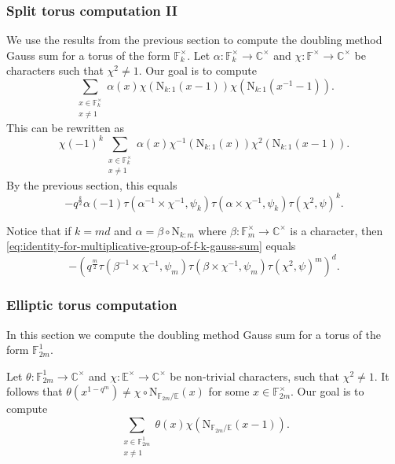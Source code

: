 \documentclass[12pt, reqno]{amsart}
\theoremstyle{definition}
\theoremstyle{definition}
\theoremstyle{definition}
\newcommand{\cComplex}{\mathbb{C}}
\newcommand{\multiplicativegroup}[1]{#1^{\times}}
\newcommand{\fieldCharacter}{\psi}
\newcommand{\FieldNorm}[2]{\mathrm{N}_{#1:#2}}
\newcommand{\aFieldNorm}{\mathrm{N}}
\newcommand{\finiteField}{\mathbb{F}}
\newcommand{\quadraticExtension}{\mathbb{E}}
\newcommand{\finiteFieldExtension}[1]{\finiteField_{#1}}
\newcommand{\GaussSumCharacter}[3]{\tau\left(#1 \times #2, #3\right)}
\begin{document}
\subsubsection{Split torus computation II}
We use the results from the previous section to compute the doubling method Gauss sum for a torus of the form $\multiplicativegroup{\finiteFieldExtension{k}}$. Let $\alpha \colon \multiplicativegroup{\finiteFieldExtension{k}} \to \multiplicativegroup{\cComplex}$ and $\chi \colon \multiplicativegroup{\finiteField} \to \multiplicativegroup{\cComplex}$ be characters such that $\chi^2 \ne 1$. Our goal is to compute $$\sum_{\substack{x \in \multiplicativegroup{\finiteFieldExtension{k}}\\
		x \ne 1}} \alpha \left(x\right) \chi\left(\FieldNorm{k}{1}\left(x - 1\right)\right) \chi\left(\FieldNorm{k}{1}\left(x^{-1} - 1\right)\right).$$
This can be rewritten as
$$\chi\left(-1\right)^k \sum_{\substack{x \in \multiplicativegroup{\finiteFieldExtension{k}}\\
		x \ne 1}} \alpha \left(x\right) \chi^{-1}\left(\FieldNorm{k}{1}\left(x\right)\right) \chi^2\left(\FieldNorm{k}{1}\left(x - 1\right)\right).$$
By the previous section, this equals
\begin{equation}\label{eq:identity-for-multiplicative-group-of-f-k-gauss-sum}
	-q^{\frac{k}{2}} \alpha\left(-1\right)  \GaussSumCharacter{\alpha^{-1}}{\chi^{-1}}{\fieldCharacter_k} \GaussSumCharacter{\alpha}{\chi^{-1}}{\fieldCharacter_k} \tau\left(\chi^2, \fieldCharacter\right)^k.
\end{equation}

Notice that if $k = md$ and $\alpha = \beta \circ \FieldNorm{k}{m}$ where $\beta \colon \multiplicativegroup{\finiteFieldExtension{m}} \to \multiplicativegroup{\cComplex}$ is a character, then \eqref{eq:identity-for-multiplicative-group-of-f-k-gauss-sum} equals
$$-\left(q^{\frac{m}{2}} \GaussSumCharacter{\beta^{-1}}{\chi^{-1}}{\fieldCharacter_m} \GaussSumCharacter{\beta}{\chi^{-1}}{\fieldCharacter_m} \tau\left(\chi^2, \fieldCharacter\right)^m\right)^{d}.$$

\subsubsection{Elliptic torus computation}
In this section we compute the doubling method Gauss sum for a torus of the form $\finiteFieldExtension{2m}^1$.

Let $\theta \colon \finiteFieldExtension{2m}^1 \to \multiplicativegroup{\cComplex}$ and $\chi \colon \multiplicativegroup{\quadraticExtension} \to \multiplicativegroup{\cComplex}$ be non-trivial characters, such that $\chi^2 \ne 1$. It follows that $\theta\left(x^{1-q^m}\right) \ne \chi \circ \aFieldNorm_{\finiteFieldExtension{2m} \slash \quadraticExtension}\left(x\right)$ for some $x \in \multiplicativegroup{\finiteFieldExtension{2m}}$. Our goal is to compute $$\sum_{\substack{x \in \finiteFieldExtension{2m}^1\\
		x \ne 1}} \theta \left(x\right) \chi\left(\aFieldNorm_{\finiteFieldExtension{2m} \slash \quadraticExtension}\left(x - 1\right)\right).$$
\end{document}
